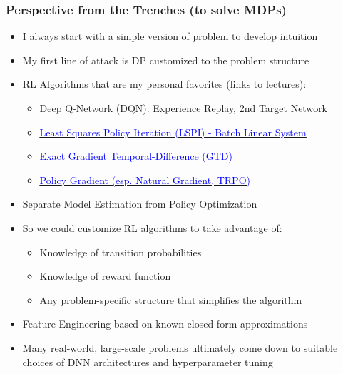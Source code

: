 \documentclass[handout]{beamer}
\begin{document}
\begin{frame}
\frametitle{Perspective from the Trenches (to solve MDPs)}
\pause
\begin{itemize}[<+->]
\item I always start with a simple version of problem to develop intuition
\item My first line of attack is DP customized to the problem structure
\item RL Algorithms that are my personal favorites (links to lectures):
\begin{itemize}
\item Deep Q-Network (DQN): Experience Replay, 2nd Target Network
\item \href{https://github.com/coverdrive/technical-documents/blob/master/finance/cme241/ValueFunctionGeometry.pdf}{\underline{\textcolor{blue}{Least Squares Policy Iteration (LSPI) - Batch Linear System}}}
\item \href {https://github.com/coverdrive/technical-documents/blob/master/finance/cme241/ValueFunctionGeometry.pdf}{\underline{\textcolor{blue}{Exact Gradient Temporal-Difference (GTD)}}}
\item \href{https://github.com/coverdrive/technical-documents/blob/master/finance/cme241/PolicyGradient.pdf}{\underline{\textcolor{blue}{Policy Gradient (esp. Natural Gradient, TRPO)}}}
\end{itemize}
\item Separate Model Estimation from Policy Optimization
\item So we could customize RL algorithms to take advantage of:
\begin{itemize}
\item Knowledge of transition probabilities
\item Knowledge of reward function
\item Any problem-specific structure that simplifies the algorithm
\end{itemize}
\item Feature Engineering based on known closed-form approximations
\item Many real-world, large-scale problems ultimately come down to
suitable choices of DNN architectures and hyperparameter tuning
\end{itemize}
\end{frame}
\end{document}
